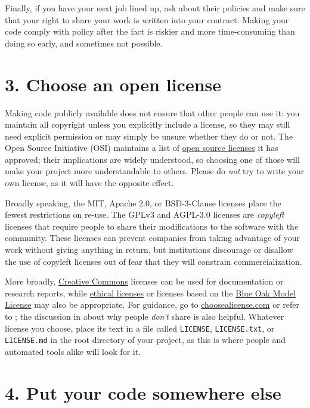 \documentclass[10pt,letterpaper]{article}
\begin{document}
Finally,
if you have your next job lined up,
ask about their policies
and make sure that your right to share your work is written into your contract.
Making your code comply with policy after the fact is riskier and more time-consuming than doing so early,
and sometimes not possible.

\section*{3. Choose an open license}

Making code publicly available does not ensure that other people can use it:
you maintain all copyright unless you explicitly include a license,
so they may still need explicit permission
or may simply be unsure whether they do or not.
The Open Source Initiative (OSI)
maintains a list of \href{https://opensource.org/licenses}{open source licenses} it has approved;
their implications are widely understood,
so choosing one of those will make your project more understandable to others.
Please do \emph{not} try to write your own license,
as it will have the opposite effect.

Broadly speaking,
the MIT, Apache 2.0, or BSD-3-Clause licenses place the fewest restrictions on re-use.
The GPLv3 and AGPL-3.0 licenses are \emph{copyleft} licenses
that require people to share their modifications to the software with the community.
These licenses can prevent companies from taking advantage of your work without giving anything in return,
but institutions discourage or disallow the use of copyleft licenses
out of fear that they will constrain commercialization.

More broadly,
\href{https://creativecommons.org/}{Creative Commons} licenses can be used for documentation or research reports,
while \href{https://ethicalsource.dev/}{ethical licenses}
or licenses based on the \href{https://blueoakcouncil.org/license/1.0.0}{Blue Oak Model License} may also be appropriate.
For guidance,
go to \href{http://choosealicense.com}{choosealicense.com}
or refer to \cite{Fogel2020,Furtonato2021};
the discussion in \cite{Gomes2022} about why people \emph{don't} share is also helpful.
Whatever license you choose,
place its text in a file called \texttt{LICENSE}, \texttt{LICENSE.txt}, or \texttt{LICENSE.md}
in the root directory of your project,
as this is where people and automated tools alike will look for it.

\section*{4. Put your code somewhere else}
\end{document}
